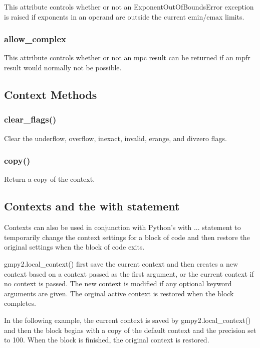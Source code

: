 This attribute controls whether or not an ExponentOutOfBoundsError exception is raised if
exponents in an operand are outside the current emin/emax limits.

\subsubsection{allow\_complex}

This attribute controls whether or not an mpc result can be returned if an mpfr result would
normally not be possible.


\subsection{Context Methods}

\subsubsection{clear\_flags()}

Clear the underflow, overflow, inexact, invalid, erange, and divzero flags.

\subsubsection{copy()}

Return a copy of the context.


\subsection{Contexts and the with statement}

Contexts can also be used in conjunction with Python's with ... statement to temporarily
change the context settings for a block of code and then restore the original settings when
the block of code exits.

\vpara
gmpy2.local\_context() first save the current context and then creates a new context
based on a context passed as the first argument, or the current context if no context is
passed. The new context is modified if any optional keyword arguments are given. The
orginal active context is restored when the block completes.

\vpara
In the following example, the current context is saved by gmpy2.local\_context() and then
the block begins with a copy of the default context and the precision set to 100. When the
block is finished, the original context is restored.

